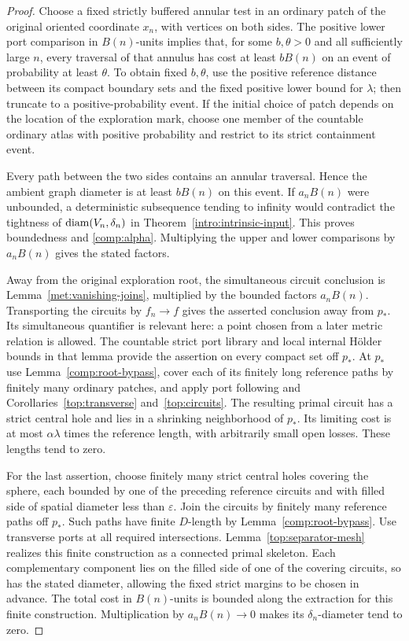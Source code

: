 \begin{proof}
Choose a fixed strictly buffered annular test in an ordinary patch
of the original oriented coordinate $x_n$, with vertices on both
sides.  The positive lower port comparison in
$B(n)$-units implies that, for some $b,\theta>0$ and all sufficiently
large $n$, every traversal of that annulus has cost at least $bB(n)$
on an event of probability at least $\theta$.  To obtain fixed
$b,\theta$, use the positive reference distance between its compact
boundary sets and the fixed positive lower bound for $\lambda$;
then truncate to a positive-probability event.  If the initial
choice of patch depends on the location of the exploration mark,
choose one member of the countable ordinary atlas with positive
probability and restrict to its strict containment event.

Every path between the two sides contains an annular traversal.
Hence the ambient graph diameter is at least $bB(n)$ on this event.
If $a_nB(n)$ were unbounded, a deterministic subsequence tending to
infinity would contradict the tightness of
$\operatorname{diam}(V_n,\delta_n)$ in Theorem~\ref{intro:intrinsic-input}.
This proves boundedness and \eqref{comp:alpha}.  Multiplying the
upper and lower comparisons by $a_nB(n)$ gives the stated factors.

Away from the original exploration root, the simultaneous circuit
conclusion is Lemma~\ref{met:vanishing-joins}, multiplied by the
bounded factors $a_nB(n)$.  Transporting the circuits by $f_n\to f$
gives the asserted conclusion away from $p_*$.  Its simultaneous
quantifier is relevant here: a point
chosen from a later metric relation is allowed.  The countable
strict port library and local internal H\"older bounds in that
lemma provide the assertion on every compact set off $p_*$.  At
$p_*$ use Lemma~\ref{comp:root-bypass}, cover each of its finitely
long reference paths by finitely many ordinary patches, and apply
port following and Corollaries~\ref{top:transverse} and~\ref{top:circuits}.
The resulting primal circuit has a strict central hole and lies in
a shrinking neighborhood of $p_*$.  Its limiting cost is at most
$\alpha\lambda$ times the reference length, with arbitrarily small
open losses.  These lengths tend to zero.

For the last assertion, choose finitely many strict central holes
covering the sphere, each bounded by one of the preceding reference
circuits and with filled side of spatial diameter less than
$\varepsilon$.  Join the circuits by finitely many reference paths
off $p_*$.  Such paths have finite $D$-length by
Lemma~\ref{comp:root-bypass}.  Use transverse ports at all required
intersections.  Lemma~\ref{top:separator-mesh} realizes this finite
construction as a connected primal skeleton.  Each complementary
component lies on the filled side of one of the covering circuits,
so has the stated diameter, allowing the fixed strict margins to
be chosen in advance.  The total cost in $B(n)$-units is bounded
along the extraction for this finite construction.  Multiplication
by $a_nB(n)\to0$ makes its $\delta_n$-diameter tend to zero.
\end{proof}

